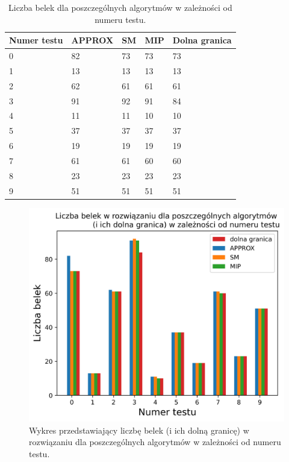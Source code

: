 \begin{table}[H] 
	\begin{center}
	\begin{tabular}{|p{3cm}|p{3cm}|p{3cm}|p{3cm}|p{3cm}| } 
		\hline
			Numer testu & APPROX & SM & MIP & Dolna granica\\ 
			\hline
			0 & 82 & 73 & 73 & 73\\ 
			1 & 13 & 13 & 13 & 13\\ 
			2 & 62 & 61 & 61 & 61\\ 
			3 & 91 & 92 & 91 & 84\\ 
			4 & 11 & 11 & 10 & 10\\ 
			5 & 37 & 37 & 37 & 37\\ 
			6 & 19 & 19 & 19 & 19\\ 
			7 & 61 & 61 & 60 & 60\\ 
			8 & 23 & 23 & 23 & 23\\ 
			9 & 51 & 51 & 51 & 51\\ 
			\hline
		\end{tabular}
			\caption{Liczba belek dla poszczególnych algorytmów w zależności od numeru testu.}
	\end{center}
\end{table}

\begin{figure}[H]
	\begin{center}
	\includegraphics[width=12cm]{plots/res}
	\caption{Wykres przedstawiający liczbę belek (i ich dolną granicę) w rozwiązaniu dla poszczególnych algorytmów w zależności od numeru testu.}
	\end{center}
\end{figure}

